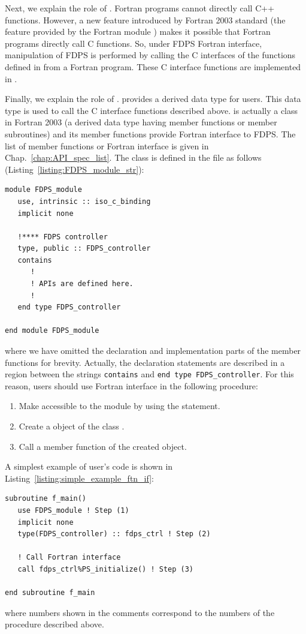 Next, we explain the role of . Fortran programs cannot directly call C++ functions. However, a new feature introduced by Fortran 2003 standard (the feature provided by the Fortran module ) makes it possible that Fortran programs directly call C functions. So, under FDPS Fortran interface, manipulation of FDPS is performed by calling the C interfaces of the functions defined in  from a Fortran program. These C interface functions are implemented in .

Finally, we explain the role of .  provides a derived data type  for users. This data type is used to call the C interface functions described above.  is actually a class in Fortran 2003 (a derived data type having member functions or member subroutines) and its member functions provide Fortran interface to FDPS. The list of member functions or Fortran interface is given in Chap.~\ref{chap:API_spec_list}. The class  is defined in the file  as follows (Listing~\ref{listing:FDPS_module_str}):
\begin{lstlisting}[caption=The structure of \texttt{FDPS\_module.F90},label=listing:FDPS_module_str]
module FDPS_module
   use, intrinsic :: iso_c_binding
   implicit none
   
   !**** FDPS controller
   type, public :: FDPS_controller
   contains
      !
      ! APIs are defined here.
      !
   end type FDPS_controller
   
end module FDPS_module  
\end{lstlisting}
where we have omitted the declaration and implementation parts of the member functions for brevity. Actually, the declaration statements are described in a region between the strings \verb|contains| and \verb|end type FDPS_controller|. For this reason, users should use Fortran interface in the following procedure:
\begin{enumerate}[leftmargin=*,itemsep=-1ex,label=(\arabic*)]
\item Make accessible to the module  by using the  statement.
\item Create a object of the class .
\item Call a member function of the created  object.
\end{enumerate}
A simplest example of user's code is shown in Listing~\ref{listing:simple_example_ftn_if}:
\begin{lstlisting}[caption=A usage example of Fortran interface,label=listing:simple_example_ftn_if]
subroutine f_main()
   use FDPS_module ! Step (1)
   implicit none
   type(FDPS_controller) :: fdps_ctrl ! Step (2)
   
   ! Call Fortran interface
   call fdps_ctrl%PS_initialize() ! Step (3)
   
end subroutine f_main
\end{lstlisting}
where numbers shown in the comments correspond to the numbers of the procedure described above.

